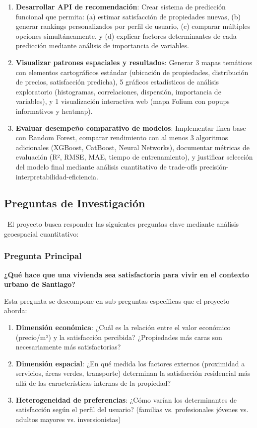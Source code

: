 \begin{enumerate}
    \item \textbf{Desarrollar API de recomendación}: Crear sistema de predicción funcional que permita: (a) estimar satisfacción de propiedades nuevas, (b) generar rankings personalizados por perfil de usuario, (c) comparar múltiples opciones simultáneamente, y (d) explicar factores determinantes de cada predicción mediante análisis de importancia de variables.
    \item \textbf{Visualizar patrones espaciales y resultados}: Generar 3 mapas temáticos con elementos cartográficos estándar (ubicación de propiedades, distribución de precios, satisfacción predicha), 5 gráficos estadísticos de análisis exploratorio (histogramas, correlaciones, dispersión, importancia de variables), y 1 visualización interactiva web (mapa Folium con popups informativos y heatmap).
    \item \textbf{Evaluar desempeño comparativo de modelos}: Implementar línea base con Random Forest, comparar rendimiento con al menos 3 algoritmos adicionales (XGBoost, CatBoost, Neural Networks), documentar métricas de evaluación (R², RMSE, MAE, tiempo de entrenamiento), y justificar selección del modelo final mediante análisis cuantitativo de trade-offs precisión-interpretabilidad-eficiencia.
    
\end{enumerate}

\subsection{Preguntas de Investigación}

\
El proyecto busca responder las siguientes preguntas clave mediante análisis geoespacial cuantitativo:

\subsubsection{Pregunta Principal}

\textbf{¿Qué hace que una vivienda sea satisfactoria para vivir en el contexto urbano de Santiago?}

Esta pregunta se descompone en sub-preguntas específicas que el proyecto aborda:

\begin{enumerate}
    \item \textbf{Dimensión económica}: ¿Cuál es la relación entre el valor económico (precio/m²) y la satisfacción percibida? ¿Propiedades más caras son necesariamente más satisfactorias?
    
    \item \textbf{Dimensión espacial}: ¿En qué medida los factores externos (proximidad a servicios, áreas verdes, transporte) determinan la satisfacción residencial más allá de las características internas de la propiedad?
    
    \item \textbf{Heterogeneidad de preferencias}: ¿Cómo varían los determinantes de satisfacción según el perfil del usuario? (familias vs. profesionales jóvenes vs. adultos mayores vs. inversionistas)
\end{enumerate}

